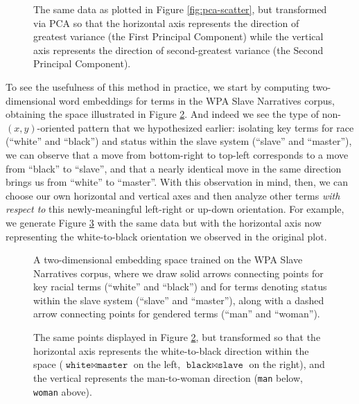 \documentclass[11pt]{article}
\newcommand{\entity}[1]{\texttt{#1}}
\begin{document}
\begin{figure}
\centering

\caption{The same data as plotted in Figure \ref{fig:pca-scatter}, but transformed via PCA so that the horizontal axis represents the direction of greatest variance (the First Principal Component) while the vertical axis represents the direction of second-greatest variance (the Second Principal Component).}
\label{fig:pca-scatter-transformed}
\end{figure}

To see the usefulness of this method in practice, we start by computing two-dimensional word embeddings for terms in the WPA Slave Narratives corpus, obtaining the space illustrated in Figure \ref{fig:wpa-embeddings}. And indeed we see the type of non-$(x,y)$-oriented pattern that we hypothesized earlier: isolating key terms for race (``white'' and ``black'') and status within the slave system (``slave'' and ``master''), we can observe that a move from bottom-right to top-left corresponds to a move from ``black'' to ``slave'', and that a nearly identical move in the same direction brings us from ``white'' to ``master''. With this observation in mind, then, we can choose our own horizontal and vertical axes and then analyze other terms \textit{with respect to} this newly-meaningful left-right or up-down orientation. For example, we generate Figure \ref{fig:wpa-embeddings-transformed} with the same data but with the horizontal axis now representing the white-to-black orientation we observed in the original plot.

\begin{figure}[ht!]
	\centering
	
	\caption{A two-dimensional embedding space trained on the WPA Slave Narratives corpus, where we draw solid arrows connecting points for key racial terms (``white'' and ``black'') and for terms denoting status within the slave system (``slave'' and ``master''), along with a dashed arrow connecting points for gendered terms (``man'' and ``woman'').}
	\label{fig:wpa-embeddings}
\end{figure}

\begin{figure}[ht!]
\centering
%

\caption{The same points displayed in Figure \ref{fig:wpa-embeddings}, but transformed so that the horizontal axis represents the white-to-black direction within the space ($\entity{white} \bowtie \entity{master}$ on the left, $\entity{black} \bowtie \entity{slave}$ on the right), and the vertical represents the man-to-woman direction (\entity{man} below, \entity{woman} above).}
\label{fig:wpa-embeddings-transformed}
\end{figure}
\end{document}
